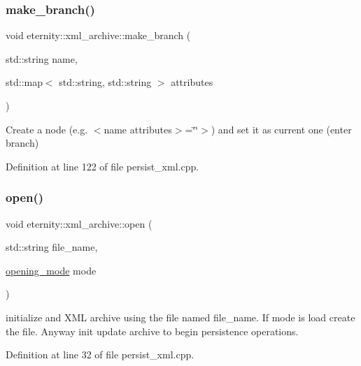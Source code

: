 \mbox{\label{classeternity_1_1xml__archive_afe1ed2f449872273acc2ca8753d4057d}} 
\subsubsection{\texorpdfstring{make\+\_\+branch()}{make\_branch()}}
{\footnotesize\ttfamily void eternity\+::xml\+\_\+archive\+::make\+\_\+branch (\begin{DoxyParamCaption}\item[{std\+::string}]{name,  }\item[{std\+::map$<$ std\+::string, std\+::string $>$}]{attributes }\end{DoxyParamCaption})}



Create a node (e.\+g. $<$name attributes$>$=\char`\"{}\char`\"{}$>$) and set it as current one (enter branch) 



Definition at line 122 of file persist\+\_\+xml.\+cpp.

\mbox{\label{classeternity_1_1xml__archive_acd5ef97a7b6a113e64e735270634bea1}} 
\subsubsection{\texorpdfstring{open()}{open()}}
{\footnotesize\ttfamily void eternity\+::xml\+\_\+archive\+::open (\begin{DoxyParamCaption}\item[{std\+::string}]{file\+\_\+name,  }\item[{\hyperlink{classeternity_1_1archive_a8881f9ce8dbed2ee600c64b7925afef0}{opening\+\_\+mode}}]{mode }\end{DoxyParamCaption})}

initialize and X\+ML archive using the file named file\+\_\+name. If mode is load create the file. Anyway init update archive to begin persistence operations. 

Definition at line 32 of file persist\+\_\+xml.\+cpp.


